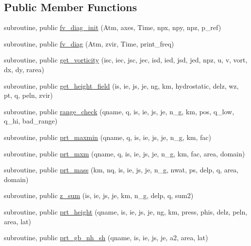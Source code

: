 \subsection*{Public Member Functions}
\begin{DoxyCompactItemize}
\item 
subroutine, public \hyperlink{classfv__diagnostics__mod_acfb51973f4727b7ba5e27a04b28d3396}{fv\-\_\-diag\-\_\-init} (Atm, axes, Time, npx, npy, npz, p\-\_\-ref)
\item 
subroutine, public \hyperlink{classfv__diagnostics__mod_a6f0646bd762a9150bf0636f22f70cfbc}{fv\-\_\-diag} (Atm, zvir, Time, print\-\_\-freq)
\item 
subroutine, public \hyperlink{classfv__diagnostics__mod_ace9737f2ccd61d13453ff9c5d2ee0243}{get\-\_\-vorticity} (isc, iec, jsc, jec, isd, ied, jsd, jed, npz, u, v, vort, dx, dy, rarea)
\item 
subroutine, public \hyperlink{classfv__diagnostics__mod_a4b9e05d8f85d0386f8af671a87d2701f}{get\-\_\-height\-\_\-field} (is, ie, js, je, ng, km, hydrostatic, delz, wz, pt, q, peln, zvir)
\item 
subroutine, public \hyperlink{classfv__diagnostics__mod_a8f268b1516b96d939365ec00d890f50e}{range\-\_\-check} (qname, q, is, ie, js, je, n\-\_\-g, km, pos, q\-\_\-low, q\-\_\-hi, bad\-\_\-range)
\item 
subroutine, public \hyperlink{classfv__diagnostics__mod_a1fad494d94b2fd086c4003778d3f9f63}{prt\-\_\-maxmin} (qname, q, is, ie, js, je, n\-\_\-g, km, fac)
\item 
subroutine, public \hyperlink{classfv__diagnostics__mod_abcfc0f6a34891af46e2cd19cbe0e8acc}{prt\-\_\-mxm} (qname, q, is, ie, js, je, n\-\_\-g, km, fac, area, domain)
\item 
subroutine, public \hyperlink{classfv__diagnostics__mod_a75e68bc179274c1183b50c3e30744951}{prt\-\_\-mass} (km, nq, is, ie, js, je, n\-\_\-g, nwat, ps, delp, q, area, domain)
\item 
subroutine, public \hyperlink{classfv__diagnostics__mod_a241554c0b6e2a59d63b56afdc01e9fd6}{z\-\_\-sum} (is, ie, js, je, km, n\-\_\-g, delp, q, sum2)
\item 
subroutine, public \hyperlink{classfv__diagnostics__mod_a2caa18f65b49b0d404e4eee6e8514441}{prt\-\_\-height} (qname, is, ie, js, je, ng, km, press, phis, delz, peln, area, lat)
\item 
subroutine, public \hyperlink{classfv__diagnostics__mod_a3a11537f686e79408ac1fbc77e75674d}{prt\-\_\-gb\-\_\-nh\-\_\-sh} (qname, is, ie, js, je, a2, area, lat)

\end{DoxyCompactItemize}
